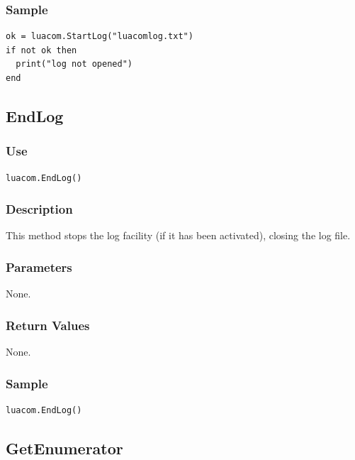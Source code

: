\documentclass[11pt,a4paper,english]{report}
\begin{document}
\subsubsection*{Sample}

\begin{verbatim}
ok = luacom.StartLog("luacomlog.txt")
if not ok then
  print("log not opened")
end
\end{verbatim}

\subsection*{EndLog}

\subsubsection*{Use}

\begin{verbatim}
luacom.EndLog()
\end{verbatim}

\subsubsection*{Description}
This method stops the log facility (if it has been activated), closing
the log file.


\subsubsection*{Parameters}

None.

\subsubsection*{Return Values}

None.

\subsubsection*{Sample}

\begin{verbatim}
luacom.EndLog()
\end{verbatim}



\subsection*{GetEnumerator}
\end{document}
